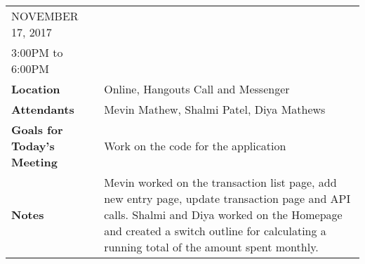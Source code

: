 \documentclass{article}
\begin{document}
\begin{table}[hp]
\begin{tabularx}{\textwidth}{lX}
\toprule
NOVEMBER 17, 2017\\
3:00PM to 6:00PM\\
\midrule
\textbf{Location} & Online, Hangouts Call and Messenger\\
\textbf{Attendants} & Mevin Mathew, Shalmi Patel, Diya Mathews\\
\midrule
\textbf{Goals for Today's Meeting} & Work on the code for the application\\
\midrule
\textbf{Notes} & Mevin worked on the transaction list page, add new entry page, update transaction page and API calls. Shalmi and Diya worked on the Homepage and created a switch outline for calculating a running total of the amount spent monthly.\\
\bottomrule
\end{tabularx}
\end{table}
\end{document}
